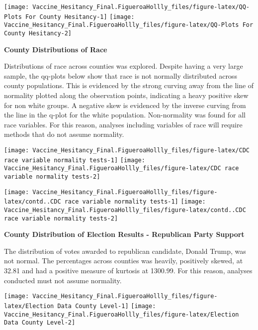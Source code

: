 \documentclass[
]{article}
\begin{document}
\texttt{[image: Vaccine\_Hesitancy\_Final.FigueroaHollly\_files/figure-latex/QQ-Plots For County Hesitancy-1]}
\texttt{[image: Vaccine\_Hesitancy\_Final.FigueroaHollly\_files/figure-latex/QQ-Plots For County Hesitancy-2]}

\textbf{County Distributions of Race}

Distributions of race across counties was explored. Despite having a
very large sample, the qq-plots below show that race is not normally
distributed across county populations. This is evidenced by the strong
curving away from the line of normality plotted along the observation
points, indicating a heavy positive skew for non white groups. A
negative skew is evidenced by the inverse curving from the line in the
q-plot for the white population. Non-normality was found for all race
variables. For this reason, analyses including variables of race will
require methods that do not assume normality.\\
\newline

\texttt{[image: Vaccine\_Hesitancy\_Final.FigueroaHollly\_files/figure-latex/CDC race variable normality tests-1]}
\texttt{[image: Vaccine\_Hesitancy\_Final.FigueroaHollly\_files/figure-latex/CDC race variable normality tests-2]}

\texttt{[image: Vaccine\_Hesitancy\_Final.FigueroaHollly\_files/figure-latex/contd..CDC race variable normality tests-1]}
\texttt{[image: Vaccine\_Hesitancy\_Final.FigueroaHollly\_files/figure-latex/contd..CDC race variable normality tests-2]}

\newline

\textbf{County Distribution of Election Results - Republican Party
Support}

The distribution of votes awarded to republican candidate, Donald Trump,
was not normal. The percentages across counties was heavily, positively
skewed, at 32.81 and had a positive measure of kurtosis at 1300.99. For
this reason, analyses conducted must not assume normality. \newline

\texttt{[image: Vaccine\_Hesitancy\_Final.FigueroaHollly\_files/figure-latex/Election Data County Level-1]}
\texttt{[image: Vaccine\_Hesitancy\_Final.FigueroaHollly\_files/figure-latex/Election Data County Level-2]}
\end{document}
